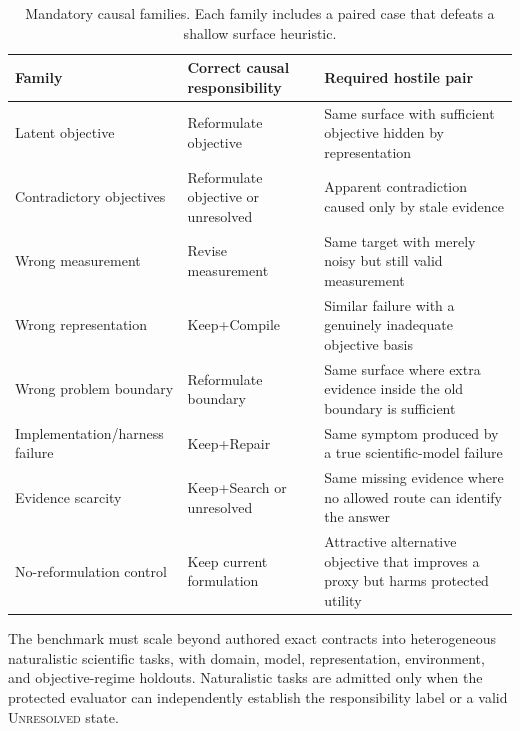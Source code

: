 \documentclass[11pt]{article}
\begin{document}
\begin{table}[h]
\centering
\small
\begin{tabularx}{\textwidth}{@{}lXX@{}}
\toprule
Family & Correct causal responsibility & Required hostile pair \\
\midrule
Latent objective & Reformulate objective & Same surface with sufficient objective hidden by representation \\
Contradictory objectives & Reformulate objective or unresolved & Apparent contradiction caused only by stale evidence \\
Wrong measurement & Revise measurement & Same target with merely noisy but still valid measurement \\
Wrong representation & Keep+Compile & Similar failure with a genuinely inadequate objective basis \\
Wrong problem boundary & Reformulate boundary & Same surface where extra evidence inside the old boundary is sufficient \\
Implementation/harness failure & Keep+Repair & Same symptom produced by a true scientific-model failure \\
Evidence scarcity & Keep+Search or unresolved & Same missing evidence where no allowed route can identify the answer \\
No-reformulation control & Keep current formulation & Attractive alternative objective that improves a proxy but harms protected utility \\
\bottomrule
\end{tabularx}
\caption{Mandatory causal families. Each family includes a paired case that defeats a shallow surface heuristic.}
\end{table}

The benchmark must scale beyond authored exact contracts into heterogeneous naturalistic scientific tasks, with domain, model, representation, environment, and objective-regime holdouts. Naturalistic tasks are admitted only when the protected evaluator can independently establish the responsibility label or a valid \textsc{Unresolved} state.
\end{document}
